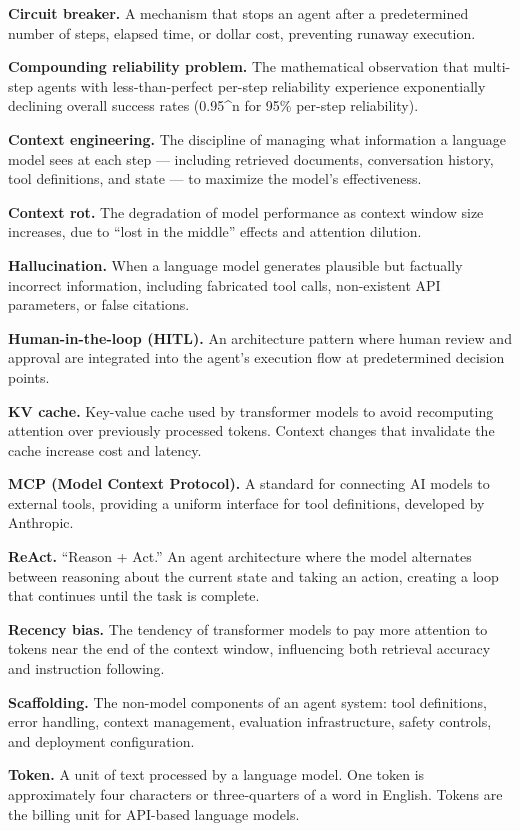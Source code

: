 \documentclass[11pt, a4paper]{article}
\begin{document}
\textbf{Circuit breaker.} A mechanism that stops an agent after a
predetermined number of steps, elapsed time, or dollar cost, preventing
runaway execution.

\textbf{Compounding reliability problem.} The mathematical observation
that multi-step agents with less-than-perfect per-step reliability
experience exponentially declining overall success rates (0.95\^{}n for
95\% per-step reliability).

\textbf{Context engineering.} The discipline of managing what
information a language model sees at each step --- including retrieved
documents, conversation history, tool definitions, and state --- to
maximize the model's effectiveness.

\textbf{Context rot.} The degradation of model performance as context
window size increases, due to ``lost in the middle'' effects and
attention dilution.

\textbf{Hallucination.} When a language model generates plausible but
factually incorrect information, including fabricated tool calls,
non-existent API parameters, or false citations.

\textbf{Human-in-the-loop (HITL).} An architecture pattern where human
review and approval are integrated into the agent's execution flow at
predetermined decision points.

\textbf{KV cache.} Key-value cache used by transformer models to avoid
recomputing attention over previously processed tokens. Context changes
that invalidate the cache increase cost and latency.

\textbf{MCP (Model Context Protocol).} A standard for connecting AI
models to external tools, providing a uniform interface for tool
definitions, developed by Anthropic.

\textbf{ReAct.} ``Reason + Act.'' An agent architecture where the model
alternates between reasoning about the current state and taking an
action, creating a loop that continues until the task is complete.

\textbf{Recency bias.} The tendency of transformer models to pay more
attention to tokens near the end of the context window, influencing both
retrieval accuracy and instruction following.

\textbf{Scaffolding.} The non-model components of an agent system: tool
definitions, error handling, context management, evaluation
infrastructure, safety controls, and deployment configuration.

\textbf{Token.} A unit of text processed by a language model. One token
is approximately four characters or three-quarters of a word in English.
Tokens are the billing unit for API-based language models.
\end{document}

